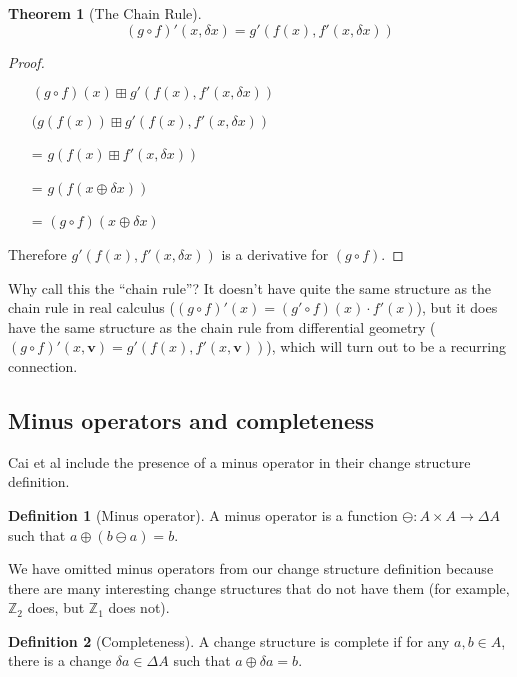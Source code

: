 \documentclass[english]{article}
\theoremstyle{plain}
\newtheorem{thm}{Theorem}
\theoremstyle{definition}
\theoremstyle{remark}
\theoremstyle{remark}
\theoremstyle{remark}
\theoremstyle{definition}
\newtheorem{defn}{Definition}
\newcommand{\cplus}{\oplus}
\newcommand{\cpluss}{\boxplus}
\newcommand{\cminus}{\ominus}
\newcommand{\changes}[1]{\Delta #1}
\newcommand{\change}[1]{\delta #1}
\newcommand{\derive}[1]{#1'}
\begin{document}
\begin{thm}[The Chain Rule]
   $$\derive{(g \circ f)}(x, \change{x}) = \derive{g}\left(f(x), \derive{f}(x, \change{x})\right)$$
\end{thm}
\begin{proof}
  \begin{itemize}
    \item[ ]$(g \circ f)(x) \cpluss \derive{g}\left(f(x), \derive{f}(x,\change{x})\right)$
    \item[ ]$(g(f(x)) \cpluss \derive{g}\left(f(x), \derive{f}(x,\change{x})\right)$
    \item[=]$g\left(f(x) \cpluss \derive{f}(x, \change{x}) \right)$
    \item[=]$g\left(f(x \cplus \change{x})\right)$
    \item[=]$(g \circ f)(x \cplus \change{x})$
  \end{itemize}
  Therefore $\derive{g}\left(f(x), \derive{f}(x, \change{x})\right)$ is a
  derivative for $(g \circ f)$.
\end{proof}

Why call this the ``chain rule''? It doesn't have quite the same structure as
the chain rule in real calculus ($\derive{(g \circ f)}(x) = (\derive{g} \circ f)
(x) \cdot \derive{f}(x)$), but it does have the same structure as the chain rule
from differential geometry ($\derive{(g \circ f)}(x, \textbf{v}) = \derive{g}
(f(x), \derive{f}(x, \textbf{v}))$), which will turn out to be a recurring connection.

\subsection{Minus operators and completeness}

Cai et al include the presence of a minus operator in their change structure
definition. 

\begin{defn}[Minus operator]
  A minus operator is a function $\cminus: A \times A \rightarrow \changes{A}$
  such that $a \cplus (b \cminus a) = b$.
\end{defn}

We have omitted minus operators from our change structure definition because
there are many interesting change structures that do not have them (for example,
$\mathbb{Z}_2$ does, but $\mathbb{Z}_1$ does not).

\begin{defn}[Completeness]
  A change structure is complete if for any $a, b \in A$, there is
  a change $\change{a} \in \changes{A}$ such that $a \cplus \change{a} = b$.
\end{defn}
\end{document}
